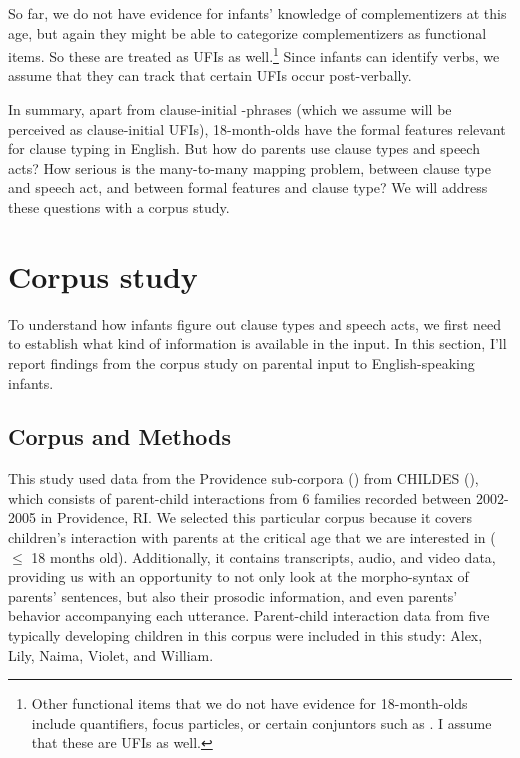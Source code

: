  So far, we do not have evidence for infants' knowledge of complementizers at this age, but again they might be able to categorize complementizers as functional items. So these are treated as UFIs as well.\footnote{ Other functional items that we do not have evidence for 18-month-olds include quantifiers, focus particles, or certain conjuntors such as . I assume that these are UFIs as well. } Since infants can identify verbs, we assume that they can track that certain UFIs occur post-verbally. 





In summary, apart from clause-initial \twh-phrases (which we assume will be perceived as clause-initial UFIs), 18-month-olds have the formal features relevant for clause typing in English. But how do parents use clause types and speech acts? How serious is the many-to-many mapping problem, between clause type and speech act, and between formal features and clause type? We will address these questions with a corpus study. %

\section{Corpus study}
\label{sec:engcl:corpus}
To understand how infants figure out clause types and speech acts, we first need to establish what kind of information is available in the input. In this section, I’ll report findings from the corpus study on parental input to English-speaking infants. 


\subsection{Corpus and Methods}
\label{sec:engcl:corpus:methods}
This study used data from the Providence sub-corpora (\cite{ProvidenceCorpus}) from CHILDES (\cite{CHILDES}), which consists of parent-child interactions from 6 families recorded between 2002-2005 in Providence, RI. We selected this particular corpus because it covers children’s interaction with parents at the critical age that we are interested in ($\leq$ 18 months old). Additionally, it contains transcripts, audio, and video data, providing us with an opportunity to not only look at the morpho-syntax of parents’ sentences, but also their prosodic information, and even parents’ behavior accompanying each utterance. Parent-child interaction data from five typically developing children in this corpus were included in this study: Alex, Lily, Naima, Violet, and William. %

